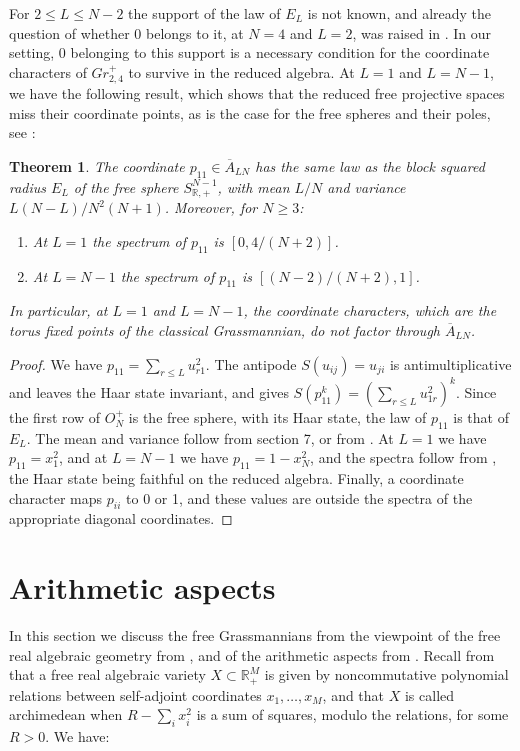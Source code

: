 \documentclass[11pt]{article}
\theoremstyle{plain}
\newtheorem{theorem}{Theorem}[section]
\begin{document}
For $2\leq L\leq N-2$ the support of the law of $E_L$ is not known, and already the question of whether $0$ belongs to it, at $N=4$ and $L=2$, was raised in \cite{mfs}. In our setting, $0$ belonging to this support is a necessary condition for the coordinate characters of $Gr^+_{2,4}$ to survive in the reduced algebra. At $L=1$ and $L=N-1$, we have the following result, which shows that the reduced free projective spaces miss their coordinate points, as is the case for the free spheres and their poles, see \cite{mfs}:

\begin{theorem}
\label{thm:p11law}
The coordinate $p_{11}\in\overline{A}_{LN}$ has the same law as the block squared radius $E_L$ of the free sphere $S^{N-1}_{\mathbb R,+}$, with mean $L/N$ and variance $L(N-L)/N^2(N+1)$. Moreover, for $N\geq3$:
\begin{enumerate}
\item At $L=1$ the spectrum of $p_{11}$ is $[0,4/(N+2)]$.

\item At $L=N-1$ the spectrum of $p_{11}$ is $[(N-2)/(N+2),1]$.
\end{enumerate}
In particular, at $L=1$ and $L=N-1$, the coordinate characters, which are the torus fixed points of the classical Grassmannian, do not factor through $\overline{A}_{LN}$.
\end{theorem}

\begin{proof}
We have $p_{11}=\sum_{r\leq L}u_{r1}^2$. The antipode $S(u_{ij})=u_{ji}$ is antimultiplicative and leaves the Haar state invariant, and gives $S(p_{11}^k)=(\sum_{r\leq L}u_{1r}^2)^k$. Since the first row of $O_N^+$ is the free sphere, with its Haar state, the law of $p_{11}$ is that of $E_L$. The mean and variance follow from section 7, or from \cite{mfs}. At $L=1$ we have $p_{11}=x_1^2$, and at $L=N-1$ we have $p_{11}=1-x_N^2$, and the spectra follow from \cite{mfs}, the Haar state being faithful on the reduced algebra. Finally, a coordinate character maps $p_{ii}$ to 0 or 1, and these values are outside the spectra of the appropriate diagonal coordinates.
\end{proof}

\section{Arithmetic aspects}

In this section we discuss the free Grassmannians from the viewpoint of the free real algebraic geometry from \cite{fba}, and of the arithmetic aspects from \cite{oba}. Recall from \cite{fba} that a free real algebraic variety $X\subset\mathbb R^M_+$ is given by noncommutative polynomial relations between self-adjoint coordinates $x_1,\ldots,x_M$, and that $X$ is called archimedean when $R-\sum_ix_i^2$ is a sum of squares, modulo the relations, for some $R>0$. We have:
\end{document}
